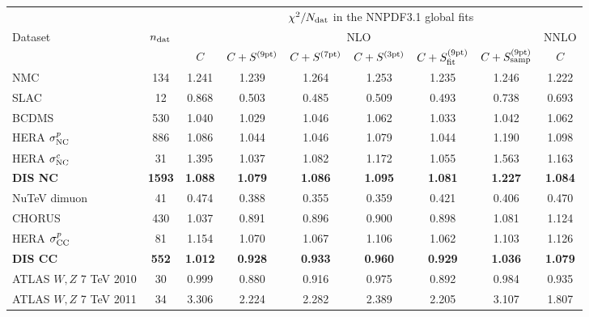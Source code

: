 \begin{table}[!p]
\begin{center}
\renewcommand*{\arraystretch}{1.4}
\scriptsize
\begin{tabular}{|l|c|c|ccc|cc|c|}
  \toprule
  &    & \multicolumn{7}{c|}{$\chi^2/N_{\rm dat}$ in the NNPDF3.1 global fits}   \\
 Dataset & $n_{\rm dat}$ & \multicolumn{6}{c|}{NLO}  & NNLO  \\
 &  & $C$ & $C+S^{(\rm 9pt)}$   &  $C+S^{(\rm 7pt)}$  &  $C+S^{(\rm 3pt)}$ & $C+S^{(\rm 9pt)}_{\rm fit}$ &
  $C+S^{(\rm 9pt)}_{\rm samp}$   &  $C$ \\
\toprule
NMC                                     &  134 & 1.241 & 1.239 & 1.264 & 1.253 & 1.235 & 1.246 & 1.222 \\
SLAC                                    &   12 & 0.868 & 0.503 & 0.485 & 0.509 & 0.493 & 0.738 & 0.693 \\
BCDMS                                   &  530 & 1.040 & 1.029 & 1.046 & 1.062 & 1.033 & 1.042 & 1.062 \\
HERA $\sigma_{\rm NC}^p$                  &  886 & 1.086 & 1.044 & 1.046 & 1.079 & 1.044 & 1.190 & 1.098 \\
HERA $\sigma_{\rm NC}^c$                  &   31 & 1.395 & 1.037 & 1.082 & 1.172 & 1.055 & 1.563 & 1.163 \\
\midrule
\bf DIS NC                              & \bf 1593 & \bf 1.088 & \bf 1.079 & \bf 1.086 & \bf 1.095 & \bf 1.081 & \bf 1.227 & \bf 1.084 \\
\midrule
NuTeV dimuon                            &   41 & 0.474 & 0.388 & 0.355 & 0.359 & 0.421 & 0.406 & 0.470 \\
CHORUS                                  &  430 & 1.037 & 0.891 & 0.896 & 0.900 & 0.898 & 1.081 & 1.124 \\
HERA $\sigma_{\rm CC}^p$                  &   81 & 1.154 & 1.070 & 1.067 & 1.106 & 1.062 & 1.103 & 1.126 \\
\midrule
\bf DIS CC                              &  \bf 552 & \bf 1.012 & \bf 0.928 & \bf 0.933 & \bf 0.960 & \bf 0.929 & \bf 1.036 & \bf 1.079 \\
\midrule
ATLAS $W,Z$ 7 TeV 2010                  &   30 & 0.999 & 0.880 & 0.916 & 0.975 & 0.892 & 0.984 & 0.935 \\
ATLAS $W,Z$ 7 TeV 2011                  &   34 & 3.306 & 2.224 & 2.282 & 2.389 & 2.205 & 3.107 & 1.807 \\

\end{tabular}
\end{center}
\end{table}
